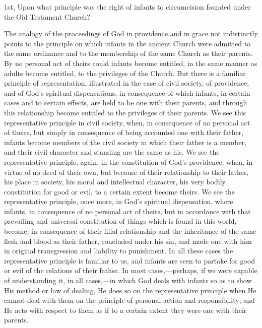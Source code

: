 \documentclass[]{book}
\begin{document}
1st, Upon what principle was the right of infants to circumcision founded under the Old Testament Church?

The analogy of the proceedings of God in providence and in grace not indistinctly points to the principle on which infants in the ancient Church were admitted to the same ordinance and to the membership of the same Church as their parents. By no personal act of theirs could infants become entitled, in the same manner as adults become entitled, to the privileges of the Church. But there is a familiar principle of representation, illustrated in the case of civil society, of providence, and of God's spiritual dispensations, in consequence of which infants, in certain cases and to certain effects, are held to be one with their parents, and through this relationship become entitled to the privileges of their parents. We see this representative principle in civil society, when, in consequence of no personal act of theirs, but simply in consequence of being accounted one with their father, infants become members of the civil society in which their father is a member, and their civil character and standing are the same as his. We see the representative principle, again, in the constitution of God's providence, when, in virtue of no deed of their own, but because of their relationship to their father, his place in society, his moral and intellectual character, his very bodily constitution for good or evil, to a certain extent become theirs. We see the representative principle, once more, in God's spiritual dispensation, where infants, in consequence of no personal act of theirs, but in accordance with that prevailing and universal constitution of things which is found in this world, become, in consequence of their filial relationship and the inheritance of the same flesh and blood as their father, concluded under his sin, and made one with him in original transgression and liability to punishment. In all these cases the representative principle is familiar to us, and infants are seen to partake for good or evil of the relations of their father. In most cases,---perhaps, if we were capable of understanding it, in all cases,---in which God deals with infants so as to show His method or law of dealing, He does so on the representative principle when He cannot deal with them on the principle of personal action and responsibility; and He acts with respect to them as if to a certain extent they were one with their parents.
\end{document}
